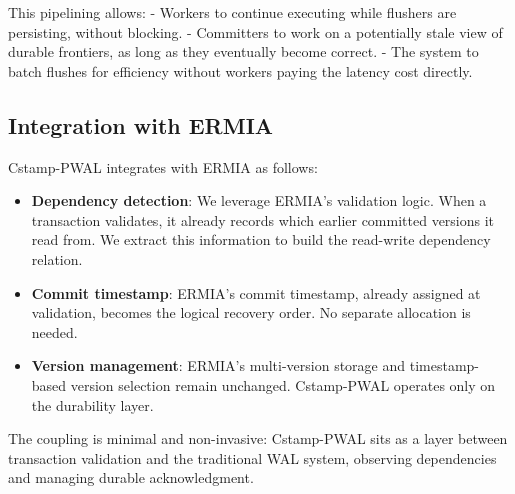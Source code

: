 This pipelining allows:
- Workers to continue executing while flushers are persisting, without blocking.
- Committers to work on a potentially stale view of durable frontiers, as long as
  they eventually become correct.
- The system to batch flushes for efficiency without workers paying the latency
  cost directly.

\subsection{Integration with ERMIA}

Cstamp-PWAL integrates with ERMIA as follows:

\begin{itemize}

\item \textbf{Dependency detection}: We leverage ERMIA's validation logic.  When a
transaction validates, it already records which earlier committed versions it read
from.  We extract this information to build the read-write dependency relation.

\item \textbf{Commit timestamp}: ERMIA's commit timestamp, already assigned at
validation, becomes the logical recovery order.  No separate allocation is needed.

\item \textbf{Version management}: ERMIA's multi-version storage and timestamp-
based version selection remain unchanged.  Cstamp-PWAL operates only on the
durability layer.

\end{itemize}

The coupling is minimal and non-invasive: Cstamp-PWAL sits as a layer between
transaction validation and the traditional WAL system, observing dependencies
and managing durable acknowledgment.

